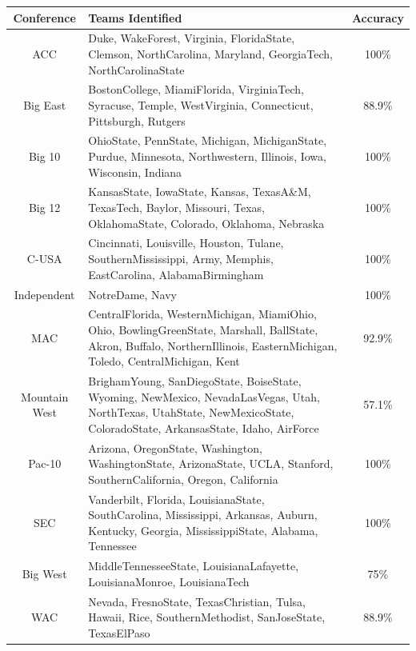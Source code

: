 \documentclass{article}\usepackage[]{graphicx}\usepackage[]{color}
\begin{document}
\begin{table}[H]
\centering
\begin{tabular}{cp{6cm}c}
  \hline
Conference & Teams Identified & Accuracy \\ 
  \hline
ACC & Duke, WakeForest, Virginia, FloridaState, Clemson, NorthCarolina, Maryland, GeorgiaTech, NorthCarolinaState & 100\% \\ 
  Big East & BostonCollege, MiamiFlorida, VirginiaTech, Syracuse, Temple, WestVirginia, Connecticut, Pittsburgh, Rutgers & 88.9\% \\ 
  Big 10 & OhioState, PennState, Michigan, MichiganState, Purdue, Minnesota, Northwestern, Illinois, Iowa, Wisconsin, Indiana & 100\% \\ 
  Big 12 & KansasState, IowaState, Kansas, TexasA\&M, TexasTech, Baylor, Missouri, Texas, OklahomaState, Colorado, Oklahoma, Nebraska & 100\% \\ 
  C-USA & Cincinnati, Louisville, Houston, Tulane, SouthernMississippi, Army, Memphis, EastCarolina, AlabamaBirmingham & 100\% \\ 
  Independent & NotreDame, Navy & 100\% \\ 
  MAC & CentralFlorida, WesternMichigan, MiamiOhio, Ohio, BowlingGreenState, Marshall, BallState, Akron, Buffalo, NorthernIllinois, EasternMichigan, Toledo, CentralMichigan, Kent & 92.9\% \\ 
  Mountain West & BrighamYoung, SanDiegoState, BoiseState, Wyoming, NewMexico, NevadaLasVegas, Utah, NorthTexas, UtahState, NewMexicoState, ColoradoState, ArkansasState, Idaho, AirForce & 57.1\% \\ 
  Pac-10 & Arizona, OregonState, Washington, WashingtonState, ArizonaState, UCLA, Stanford, SouthernCalifornia, Oregon, California & 100\% \\ 
  SEC & Vanderbilt, Florida, LouisianaState, SouthCarolina, Mississippi, Arkansas, Auburn, Kentucky, Georgia, MississippiState, Alabama, Tennessee & 100\% \\ 
  Big West & MiddleTennesseeState, LouisianaLafayette, LouisianaMonroe, LouisianaTech & 75\% \\ 
  WAC & Nevada, FresnoState, TexasChristian, Tulsa, Hawaii, Rice, SouthernMethodist, SanJoseState, TexasElPaso & 88.9\% \\ 
   \hline
\end{tabular}
\end{table}
\end{document}
